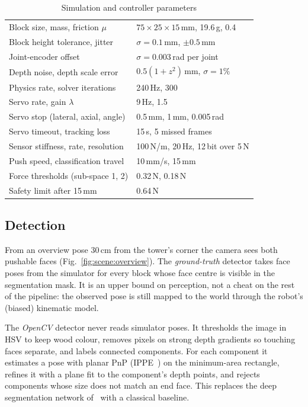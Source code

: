 \documentclass[conference]{IEEEtran}
\begin{document}
\begin{table}[t]
\centering
\caption{Simulation and controller parameters}
\label{tab:params}
\footnotesize
\setlength{\tabcolsep}{4pt}
\begin{tabular}{@{}ll@{}}
\toprule
Block size, mass, friction $\mu$ & $75{\times}25{\times}15$\,mm, 19.6\,g, 0.4 \\
Block height tolerance, jitter & $\sigma=0.1$\,mm, $\pm0.5$\,mm \\
Joint-encoder offset & $\sigma=0.003$\,rad per joint \\
Depth noise, depth scale error & $0.5(1+z^2)$\,mm, $\sigma=1\%$ \\
Physics rate, solver iterations & 240\,Hz, 300 \\
Servo rate, gain $\lambda$ & 9\,Hz, 1.5 \\
Servo stop (lateral, axial, angle) & 0.5\,mm, 1\,mm, 0.005\,rad \\
Servo timeout, tracking loss & 15\,s, 5 missed frames \\
Sensor stiffness, rate, resolution & 100\,N/m, 20\,Hz, 12\,bit over 5\,N \\
Push speed, classification travel & 10\,mm/s, 15\,mm \\
Force thresholds (sub-space 1, 2) & 0.32\,N, 0.18\,N \\
Safety limit after 15\,mm & 0.64\,N \\
\bottomrule
\end{tabular}
\end{table}

\subsection{Detection}

From an overview pose 30\,cm from the tower's corner the camera sees both pushable
faces (Fig.~\ref{fig:scene:overview}). The \emph{ground-truth} detector takes face
poses from the simulator for every block whose face centre is visible in the
segmentation mask. It is an upper bound on perception, not a cheat on the rest of the
pipeline: the observed pose is still mapped to the world through the robot's
(biased) kinematic model.

The \emph{OpenCV} detector never reads simulator poses. It thresholds the image in HSV
to keep wood colour, removes pixels on strong depth gradients so touching faces
separate, and labels connected components. For each component it estimates a pose
with planar PnP (IPPE~\cite{collins2014}) on the minimum-area rectangle, refines it
with a plane fit to the component's depth points, and rejects components whose size
does not match an end face. This replaces the deep segmentation network
of~\cite{marchionna2023} with a classical baseline.
\end{document}
